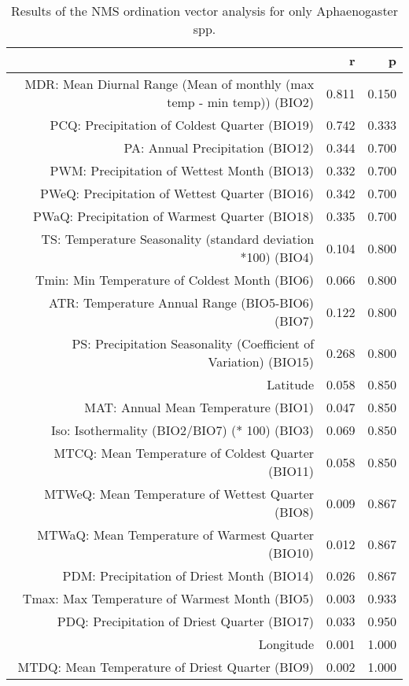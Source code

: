 \begin{table}[ht]
\centering
\begin{tabular}{rrr}
  \hline
 & r & p \\ 
  \hline
MDR: Mean Diurnal Range (Mean of monthly (max temp - min temp)) (BIO2) & 0.811 & 0.150 \\ 
  PCQ: Precipitation of Coldest Quarter (BIO19) & 0.742 & 0.333 \\ 
  PA: Annual Precipitation (BIO12) & 0.344 & 0.700 \\ 
  PWM: Precipitation of Wettest Month (BIO13) & 0.332 & 0.700 \\ 
  PWeQ: Precipitation of Wettest Quarter (BIO16) & 0.342 & 0.700 \\ 
  PWaQ: Precipitation of Warmest Quarter (BIO18) & 0.335 & 0.700 \\ 
  TS: Temperature Seasonality (standard deviation *100) (BIO4) & 0.104 & 0.800 \\ 
  Tmin: Min Temperature of Coldest Month (BIO6) & 0.066 & 0.800 \\ 
  ATR: Temperature Annual Range (BIO5-BIO6) (BIO7) & 0.122 & 0.800 \\ 
  PS: Precipitation Seasonality (Coefficient of Variation) (BIO15) & 0.268 & 0.800 \\ 
  Latitude & 0.058 & 0.850 \\ 
  MAT: Annual Mean Temperature (BIO1) & 0.047 & 0.850 \\ 
  Iso: Isothermality (BIO2/BIO7) (* 100) (BIO3) & 0.069 & 0.850 \\ 
  MTCQ: Mean Temperature of Coldest Quarter (BIO11) & 0.058 & 0.850 \\ 
  MTWeQ: Mean Temperature of Wettest Quarter (BIO8) & 0.009 & 0.867 \\ 
  MTWaQ: Mean Temperature of Warmest Quarter (BIO10) & 0.012 & 0.867 \\ 
  PDM: Precipitation of Driest Month (BIO14) & 0.026 & 0.867 \\ 
  Tmax: Max Temperature of Warmest Month (BIO5) & 0.003 & 0.933 \\ 
  PDQ: Precipitation of Driest Quarter (BIO17) & 0.033 & 0.950 \\ 
  Longitude & 0.001 & 1.000 \\ 
  MTDQ: Mean Temperature of Driest Quarter (BIO9) & 0.002 & 1.000 \\ 
   \hline
\end{tabular}
\caption{Results of the NMS ordination vector analysis for only Aphaenogaster spp.} 
\label{tab:wc_apg_vec}
\end{table}
